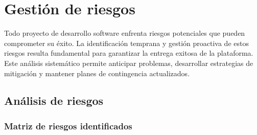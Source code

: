 \documentclass[12pt,a4paper,oneside]{report}
\begin{document}
\section{Gestión de riesgos}\label{gestiuxf3n-de-riesgos}

Todo proyecto de desarrollo software enfrenta riesgos potenciales que pueden comprometer su éxito. La identificación temprana y gestión proactiva de estos riesgos resulta fundamental para garantizar la entrega exitosa de la plataforma. Este análisis sistemático permite anticipar problemas, desarrollar estrategias de mitigación y mantener planes de contingencia actualizados.

\subsection{Análisis de riesgos}\label{anuxe1lisis-de-riesgos}

\subsubsection{Matriz de riesgos
identificados}\label{matriz-de-riesgos-identificados}
\end{document}

